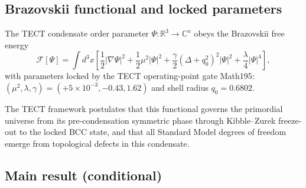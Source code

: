 \subsection{Brazovskii functional and locked parameters}

The TECT condensate order parameter $\Psi : \mathbb{R}^3 \to \mathbb{C}^n$
obeys the Brazovskii free energy
\begin{equation}
\mathcal{F}[\Psi] = \int d^3x \left[
\frac{1}{2}|\nabla\Psi|^2 + \frac{1}{2}\mu^2|\Psi|^2 +
\frac{\gamma}{2}(\Delta + q_0^2)^2|\Psi|^2 + \frac{\lambda}{4}|\Psi|^4
\right],
\label{eq:brazovskii}
\end{equation}
with parameters locked by the TECT operating-point gate Math195:
$(\mu^2, \lambda, \gamma) = (+5\times 10^{-3}, -0.43, 1.62)$ and shell
radius $q_0 = 0.6802$.

The TECT framework postulates that this functional governs the primordial
universe from its pre-condensation symmetric phase through Kibble--Zurek
freeze-out to the locked BCC state, and that all Standard Model degrees of
freedom emerge from topological defects in this condensate.

\subsection{Main result (conditional)}

